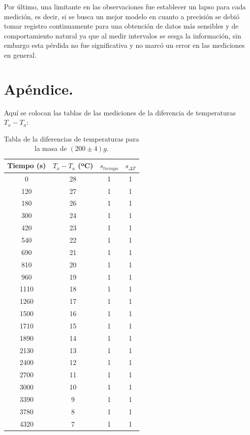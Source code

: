 \documentclass[a4paper]{article}
\begin{document}
Por último, una limitante en las observaciones fue establecer un lapso para cada medición, es decir, si se busca un mejor modelo en cuanto a precisión  se debió tomar registro continuamente para una obtención de datos más sensibles y de comportamiento natural ya que al medir intervalos se sesga la información, sin embargo esta pérdida no fue significativa y no marcó un error en las mediciones en general.


\section{Apéndice.}
Aquí se colocan las tablas de las mediciones de la diferencia de temperaturas $T_x - T_a$:
\begin{table}[H]
  \centering
    \begin{tabular}{|c|c|c|c|} \hline
    Tiempo (s) & $T_x - T_a$ (ºC) & $s_{tiempo }$ & $s_{ \Delta T} $\\ \hline
    0     & 28    & 1     & 1 \\ \hline
    120   & 27    & 1     & 1 \\ \hline
    180   & 26    & 1     & 1 \\ \hline
    300   & 24    & 1     & 1 \\ \hline
    420   & 23    & 1     & 1 \\ \hline
    540   & 22    & 1     & 1 \\ \hline
    690   & 21    & 1     & 1 \\ \hline
    810   & 20    & 1     & 1 \\ \hline
    960   & 19    & 1     & 1 \\ \hline
    1110  & 18    & 1     & 1 \\ \hline
    1260  & 17    & 1     & 1 \\ \hline
    1500  & 16    & 1     & 1 \\ \hline
    1710  & 15    & 1     & 1 \\ \hline
    1890  & 14    & 1     & 1 \\ \hline
    2130  & 13    & 1     & 1 \\ \hline
    2400  & 12    & 1     & 1 \\ \hline
    2700  & 11    & 1     & 1 \\ \hline
    3000  & 10    & 1     & 1 \\ \hline
    3390  & 9     & 1     & 1 \\ \hline
    3780  & 8     & 1     & 1 \\ \hline
    4320  & 7     & 1     & 1 \\ \hline
    \end{tabular}%
  \caption{Tabla de la diferencias de temperaturas para la masa de $(200\pm 4)g$.}
\end{table}%
\end{document}
